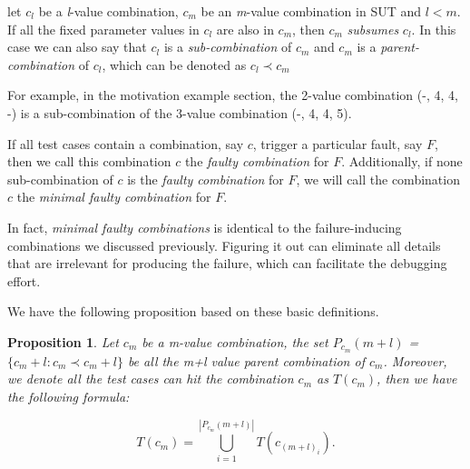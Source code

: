 \documentclass{sig-alternate}
\begin{document}
\begin{definition}
let $c_{l}$ be a \emph{l}-value combination, $c_{m}$ be an \emph{m}-value combination in SUT and $l < m$. If all the fixed parameter values in $c_{l}$ are also in $c_{m}$, then $c_{m}$ \emph{subsumes} $c_{l}$. In this case we can also say that $c_{l}$ is a \emph{sub-combination} of $c_{m}$ and $c_{m}$ is a \emph{parent-combination} of $c_{l}$, which can be denoted as $c_{l} \prec  c_{m}$
\end{definition}

For example, in the motivation example section, the 2-value combination (-, 4, 4, -) is a sub-combination of the 3-value combination (-, 4, 4, 5).

\begin{definition}
If all test cases contain a combination, say $c$, trigger a particular fault, say $F$, then we call this combination $c$ the \emph{faulty combination} for $F$. Additionally, if none sub-combination of $c$ is the \emph{faulty combination} for $F$, we will call the combination $c$ the \emph{minimal faulty combination} for $F$.

\end{definition}

In fact, \emph{minimal faulty combinations} is identical to the failure-inducing combinations we discussed previously. Figuring it out can eliminate all details that are irrelevant for producing the failure, which can facilitate the debugging effort.


We have the following proposition based on these basic definitions.

\newtheorem{proposition}{Proposition}
\begin{proposition}
Let $c_{m}$ be a m-value combination, the set $P_{c_{m}}(m+l)$ = $ \{c_m+l : c_m \prec c_m+l \}$ be all the m+l value parent combination of $c_{m}$. Moreover, we denote all the test cases can \emph{hit} the combination $c_{m}$ as $T(c_{m})$,  then we have the following formula:

\begin{displaymath} T(c_{m}) = \bigcup_{i = 1}^{|P_{c_{m}}(m+l)|} T(c_{(m+l)_{i}}).\end{displaymath}

\end{proposition}
\end{document}
